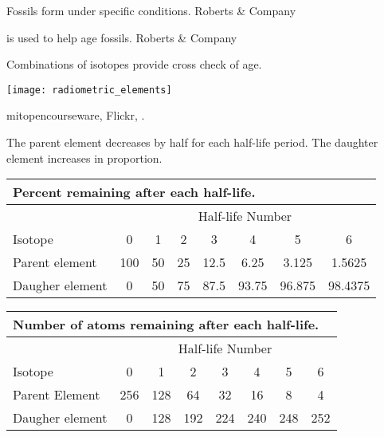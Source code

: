 \documentclass[t]{beamer}
\begin{document}
%
{
\begin{frame}[b]{Fossils form under specific conditions.}
\hfill \tiny \textcopyright Roberts \& Company
\end{frame}
}
%
{
\begin{frame}[b]{ is used to help age fossils.}
\hfill \tiny \textcopyright Roberts \& Company
\end{frame}
}
%
\begin{frame}[t]{Combinations of isotopes provide cross check of age.}

	\texttt{[image: radiometric\_elements]}

	\vfilll
	
	\hfill \tiny mitopencourseware, Flickr, .

\end{frame}
%
\begin{frame}[t]{The parent element decreases by half for each half-life period. The daughter element increases in proportion.}

    {\liningtab
    \begin{longtable}[c]{@{}lccccccc@{}}
    \multicolumn{8}{l}{Percent remaining after each half-life.}\tabularnewline
    \toprule
    	& \multicolumn{7}{c}{Half-life Number}\tabularnewline
    	\cmidrule{2-8}
    Isotope	& 0 & 1 & 2 & 3 & 4 & 5 & 6 \tabularnewline
    \midrule
    Parent element 	& 100 & 50 & 25 & 12.5 & 6.25   & 3.125 & 1.5625 \tabularnewline
    Daugher element & 0     & 50 & 75 & 87.5 & 93.75 & 96.875 & 98.4375 \tabularnewline 
    \bottomrule
    \end{longtable}
    
    \pause
    
    \begin{longtable}{@{}lccccccc@{}}
    \multicolumn{8}{l}{Number of atoms remaining after each half-life.}\tabularnewline
    \toprule
    	& \multicolumn{7}{c}{Half-life Number}\tabularnewline
    	\cmidrule{2-8}
    Isotope	& 0 & 1 & 2 & 3 & 4 & 5 & 6 \tabularnewline
    \midrule
    Parent Element 	& 256 & 128 & 64 & 32 & 16   & 8 & 4 \tabularnewline
    Daugher element & 0   & 128 & 192 & 224 & 240 & 248 & 252 \tabularnewline 
    \bottomrule
    \end{longtable}
    }%
    
\end{frame}
\end{document}
